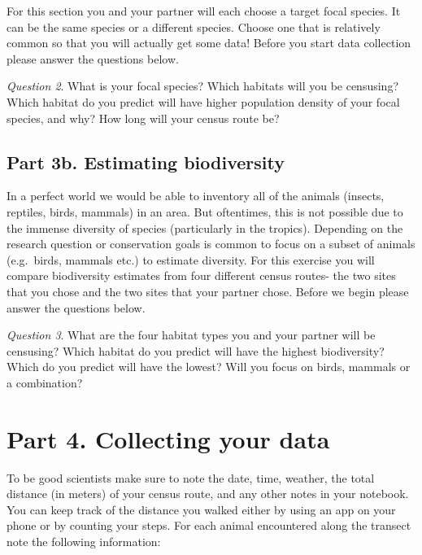 \documentclass[]{book}
\begin{document}
For this section you and your partner will each choose a target focal species. It can be the same species or a different species. Choose one that is relatively common so that you will actually get some data! Before you start data collection please answer the questions below.

\emph{Question 2}. What is your focal species? Which habitats will you be censusing? Which habitat do you predict will have higher population density of your focal species, and why? How long will your census route be?

\hypertarget{part-3b.-estimating-biodiversity}{%
\subsection*{Part 3b. Estimating biodiversity}\label{part-3b.-estimating-biodiversity}}

In a perfect world we would be able to inventory all of the animals (insects, reptiles, birds, mammals) in an area. But oftentimes, this is not possible due to the immense diversity of species (particularly in the tropics). Depending on the research question or conservation goals is common to focus on a subset of animals (e.g.~birds, mammals etc.) to estimate diversity. For this exercise you will compare biodiversity estimates from four different census routes- the two sites that you chose and the two sites that your partner chose. Before we begin please answer the questions below.

\emph{Question 3}. What are the four habitat types you and your partner will be censusing? Which habitat do you predict will have the highest biodiversity? Which do you predict will have the lowest? Will you focus on birds, mammals or a combination?

\hypertarget{part-4.-collecting-your-data}{%
\section*{Part 4. Collecting your data}\label{part-4.-collecting-your-data}}

To be good scientists make sure to note the date, time, weather, the total distance (in meters) of your census route, and any other notes in your notebook. You can keep track of the distance you walked either by using an app on your phone or by counting your steps. For each animal encountered along the transect note the following information:
\end{document}
